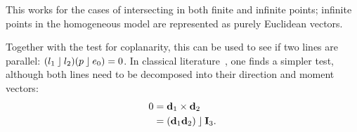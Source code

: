 This works for the cases of intersecting in both finite and infinite points; infinite points in the homogeneous model are represented as purely Euclidean vectors.

Together with the test for coplanarity, this can be used to see if two lines are parallel: $(l_1 \mathbin{\rfloor} l_2) (p \mathbin{\rfloor} e_0) = 0$.  In classical literature~\cite{Shoemake}, one finds a simpler test, although both lines need to be decomposed into their direction and moment vectors:
\begin{align*}
  0 &= \mathbf{d}_1 \times \mathbf{d}_2 \\
    &= \left( \mathbf{d}_1 \mathbf{d}_2 \right) \mathbin{\rfloor} \mathbf{I}_3 .
\end{align*}
